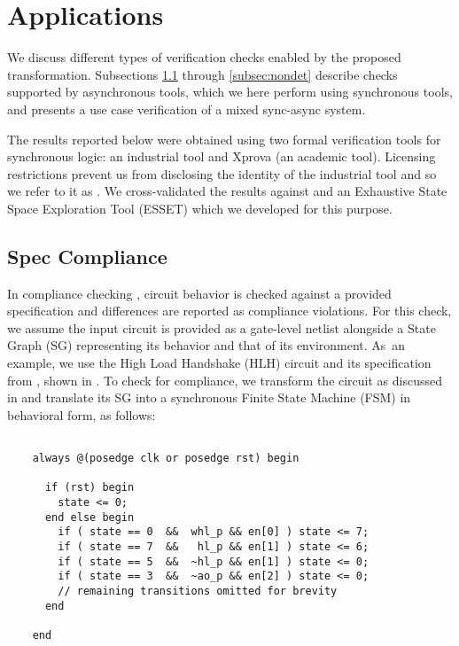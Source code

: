 \section{Applications}

We discuss different types of verification checks enabled by the proposed
transformation. Subsections \ref{subsec:compliance} through
\ref{subsec:nondet} describe checks supported by asynchronous tools, which we
here perform using synchronous tools, and  presents a use
case verification of a mixed sync-async system.

The results reported below were obtained using two formal verification tools
for synchronous logic: an industrial tool and Xprova \cite{tarawneh2017xprova}
(an academic tool). Licensing restrictions prevent us from disclosing the
identity of the industrial tool and so we refer to it as \ind. We
cross-validated the results against \mpsat{} and an Exhaustive State Space
Exploration Tool (ESSET) which we developed for this purpose.

\subsection{Spec Compliance}
\label{subsec:compliance}

In compliance checking \cite{poliakov2008automated}, circuit behavior is
checked against a provided specification and differences are reported as
compliance violations. For this check, we assume the input circuit is provided
as a gate-level netlist alongside a State Graph (SG) representing its behavior
and that of its environment. As~an example, we use the High Load Handshake
(HLH) circuit and its specification from \cite{sokolov2015design}, shown in
. To check for compliance, we transform the circuit as
discussed in  and translate its SG into a synchronous
Finite State Machine (FSM) in behavioral form, as follows:

\vspace{0.2cm}

\begin{tcolorbox}[frame hidden,interior hidden,boxsep=0pt,boxrule=1pt]
	\footnotesize
	\begin{verbatim}

	always @(posedge clk or posedge rst) begin

	  if (rst) begin
	    state <= 0;
	  end else begin
	    if ( state == 0  &&  whl_p && en[0] ) state <= 7;
	    if ( state == 7  &&   hl_p && en[1] ) state <= 6;
	    if ( state == 5  &&  ~hl_p && en[1] ) state <= 0;
	    if ( state == 3  &&  ~ao_p && en[2] ) state <= 0;
	    // remaining transitions omitted for brevity
	  end

	end
	\end{verbatim}
\end{tcolorbox}

